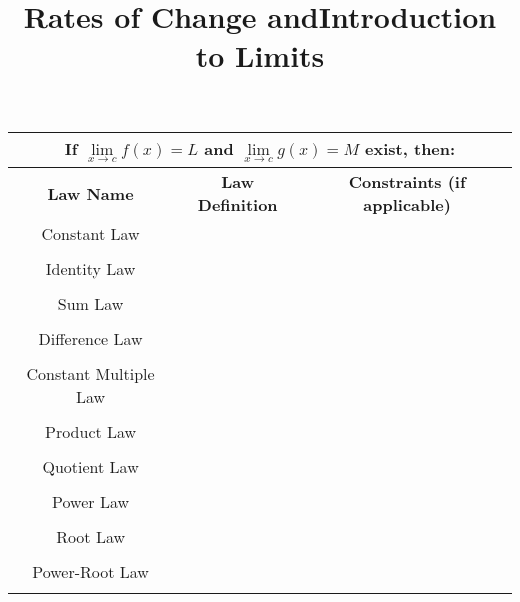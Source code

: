 \documentclass{siproblemset}
\title{Rates of Change and\linebreak Introduction to Limits}
\begin{document}
    \maketitle
    
    
    \tinyspace
    
    \tinyspace
    
    \begin{center}
        \begin{tabular}{ |c|c|c| } 
            \hline
            \multicolumn{3}{|c|}{If $\lim\limits_{x\rightarrow c}f(x)=L$ and $\lim\limits_{x\rightarrow c}g(x)=M$ exist, then:}\\[4ex]
            \hline
            \textbf{Law Name} & \textbf{Law Definition} & \textbf{Constraints (if applicable)} \\ 
            \hline
            Constant Law & \hspace{3in} & \\ 
            &&\\
            \hline
            Identity Law & \hspace{3in} & \\ 
            &&\\
            \hline
            Sum Law & \hspace{3in} & \\ 
            &&\\
            \hline
            Difference Law & \hspace{3in} & \\ 
            &&\\
            \hline
            Constant Multiple Law & \hspace{3in} & \\ 
            &&\\
            \hline
            Product Law & \hspace{3in} & \\ 
            &&\\
            \hline
            Quotient Law & \hspace{3in} & \\ 
            &&\\
            \hline
            Power Law & \hspace{3in} & \\ 
            &&\\
            \hline
            Root Law & \hspace{3in} & \\ 
            &&\\
            \hline
            Power-Root Law & \hspace{3in} & \\ 
            &&\\
            \hline
        \end{tabular}
    \end{center}
\end{document}
